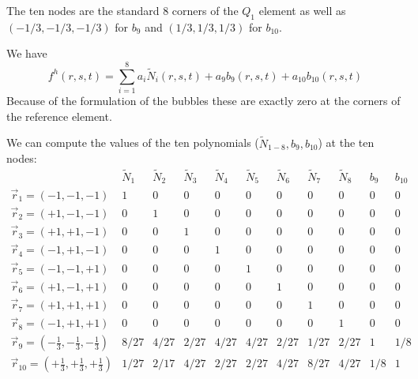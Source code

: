 The ten nodes are the standard 8 corners of the $Q_1$ element as well 
as $(-1/3,-1/3,-1/3)$ for $b_9$ and $(1/3,1/3,1/3)$ for $b_{10}$.

We have
\[
f^h(r,s,t) = \sum_{i=1}^{8} a_i \tilde{N}_i(r,s,t) + a_9 b_9(r,s,t) + a_{10} b_{10}(r,s,t)
\]
Because of the formulation of the bubbles these are exactly zero at the corners of the reference element.


We can compute the values of the ten polynomials ($\tilde{N}_{1-8},b_9,b_{10}$) at the ten nodes:
\[
\begin{array}{c|cccccccccc}
 & \tilde{N}_1 & \tilde{N}_2 & \tilde{N}_3 & \tilde{N}_4 & \tilde{N}_5 
 & \tilde{N}_6 & \tilde{N}_7 & \tilde{N}_8 & b_9 & b_{10}\\
 \hline\hline
\vec{r}_1=(-1,-1,-1)    &1 &0 &0 &0 &0 &0 &0 &0 &0 &0 \\
\vec{r}_2=(+1,-1,-1)    &0 &1 &0 &0 &0 &0 &0 &0 &0 &0 \\
\vec{r}_3=(+1,+1,-1)    &0 &0 &1 &0 &0 &0 &0 &0 &0 &0 \\
\vec{r}_4=(-1,+1,-1)    &0 &0 &0 &1 &0 &0 &0 &0 &0 &0 \\
\vec{r}_5=(-1,-1,+1)    &0 &0 &0 &0 &1 &0 &0 &0 &0 &0 \\
\vec{r}_6=(+1,-1,+1)    &0 &0 &0 &0 &0 &1 &0 &0 &0 &0 \\
\vec{r}_7=(+1,+1,+1)    &0 &0 &0 &0 &0 &0 &1 &0 &0 &0 \\
\vec{r}_8=(-1,+1,+1)    &0 &0 &0 &0 &0 &0 &0 &1 &0 &0 \\
\vec{r}_9=(-\frac13,-\frac13,-\frac13)    &8/27 & 4/27 & 2/27  & 4/27 & 4/27 & 2/27& 1/27& 2/27 &1 & 1/8\\
\vec{r}_{10}=(+\frac13,+\frac13,+\frac13) &1/27 & 2/17 & 4/27 & 2/27 & 2/27& 4/27& 8/27& 4/27& 1/8  &1 \\
\end{array}
\]





